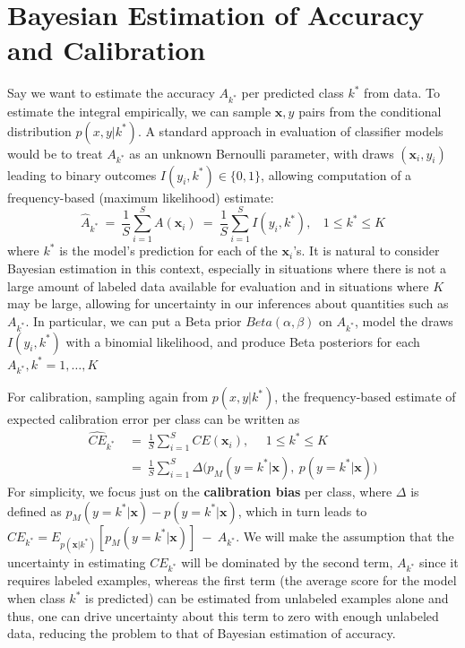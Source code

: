 \documentclass{article}
\newcommand{\ux}{{\mathbf{x}}}
\newcommand{\robby}[1]{\textcolor{Red}{[#1]\textsubscript{Robby}}}
\begin{document}
\section{Bayesian Estimation of Accuracy and Calibration}
Say we want to estimate the accuracy ${A}_{k^*}$ per predicted class $k^*$ from data. To estimate the integral empirically, we can sample $\ux,y$ pairs from the conditional distribution $p(x,y | k^*)$.
A standard approach in evaluation of classifier models would be to treat ${A}_{k^*}$ as an unknown Bernoulli parameter, with draws $(\ux_i,y_i)$ leading to binary outcomes $I(y_i, k^*) \in \{0,1\}$, allowing computation of a frequency-based (maximum likelihood) estimate:
\[
\hat{A}_{k^*} \ = \  \frac{1}{S} \sum_{i=1}^S A(\ux_i) 
 \ = \ \frac{1}{S} \sum_{i=1}^S I(y_i, k^*), \ \ \ \ 1 \le k^* \le K   
\]
where $k^*$ is the model's prediction for each of the $\ux_i$'s.
It is natural to consider Bayesian estimation in this context, especially in situations where there is not a large amount of labeled data available for evaluation and in situations where $K$ may be large,  allowing for  uncertainty in our inferences about quantities such as ${A}_{k^*}$.
In particular, we can put a Beta prior $Beta(\alpha, \beta)$ on ${A}_{k^*}$, model the draws $I(y_i, k^*)$ with a binomial likelihood, and produce Beta posteriors for each ${A}_{k^*}, k^* = 1,\ldots,K$
 
For calibration, %
sampling again from  $p(x,y | k^*)$,
the frequency-based estimate of expected calibration error per class can be written as  
\begin{align*}
\hat{CE}_{k^*} & \ = \  \frac{1}{S} \sum_{i=1}^S CE(\ux_i), \ \  \ \ \ \ 1 \le k^* \le K \\
 &  \ = \  \frac{1}{S} \sum_{i=1}^S \Delta\bigl(p_M(y = k^*| \ux), \  p(y =k^*| \ux)  \bigr) 
\end{align*}
For simplicity, we focus just on the {\bf calibration bias}  per class, where  $\Delta$ is defined as $p_M(y = k^*| \ux) - p(y =k^*| \ux)$, which in turn leads to
$CE_{k^*} = %
E_{p(\ux|k^*)}[ p_M(y = k^*| \ux)] \ - \  {A}_{k^*} $.
We will make the assumption that the uncertainty in estimating $CE_{k^*}$ will be dominated by the second term, ${A}_{k^*}$ since it requires labeled examples, whereas the first term (the average score for the model when class $k^*$ is predicted) can be estimated from unlabeled examples alone and thus, one can drive uncertainty about this term to zero with enough unlabeled data, reducing the problem to that of Bayesian estimation of accuracy.
\end{document}
